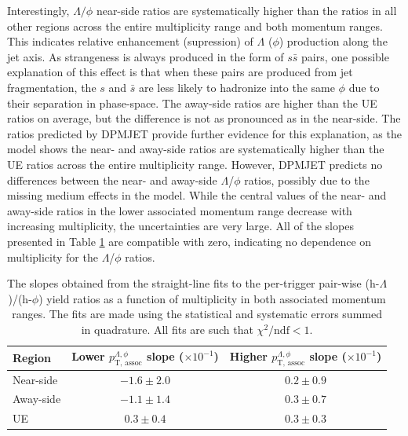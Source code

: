 Interestingly, $\Lambda/\phi$ near-side ratios are systematically higher than the ratios in all other regions across the entire multiplicity range and both momentum ranges. This indicates relative enhancement (supression) of $\Lambda$ ($\phi$) production along the jet axis. As strangeness is always produced in the form of $s\bar{s}$ pairs, one possible explanation of this effect is that when these pairs are produced from jet fragmentation, the $s$ and $\bar{s}$ are less likely to hadronize into the same $\phi$ due to their separation in phase-space. The away-side ratios are higher than the UE ratios on average, but the difference is not as pronounced as in the near-side.  The ratios predicted by DPMJET provide further evidence for this explanation, as the model shows the near- and away-side ratios are systematically higher than the UE ratios across the entire multiplicity range. However, DPMJET predicts no differences between the near- and away-side $\Lambda$/$\phi$ ratios, possibly due to the missing medium effects in the model. While the central values of the near- and away-side ratios in the lower associated momentum range decrease with increasing multiplicity, the uncertainties are very large. All of the slopes presented in Table \ref{tab:lambda_phi_slopes} are compatible with zero, indicating no dependence on multiplicity for the $\Lambda$/$\phi$ ratios.

\begin{table}
\centering
\caption{The slopes obtained from the straight-line fits to the per-trigger pair-wise (h-$\Lambda$)/(h-$\phi$) yield ratios as a function of multiplicity in both associated momentum ranges. The fits are made using the statistical and systematic errors summed in quadrature. All fits are such that $\chi^{2}/\text{ndf} < 1$.}
\begin{tabular}{l c c}
\hline
Region & Lower $p_{\text{T, assoc}}^{\Lambda, \phi}$ slope ($\times10^{-1}$) & Higher $p_{\text{T, assoc}}^{\Lambda, \phi}$ slope ($\times10^{-1}$) \\
\hline
Near-side & $ -1.6\pm 2.0$ & $0.2 \pm 0.9$ \\
Away-side & $ -1.1 \pm 1.4$ & $0.3 \pm 0.7$ \\
UE & $0.3 \pm 0.4$ & $0.3 \pm 0.3$ \\
\hline
\end{tabular}
\label{tab:lambda_phi_slopes}
\end{table}


